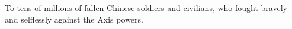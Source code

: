 \begin{dedication}
To tens of millions of fallen Chinese soldiers and civilians, who fought bravely and selflessly against the Axis powers.
\end{dedication}